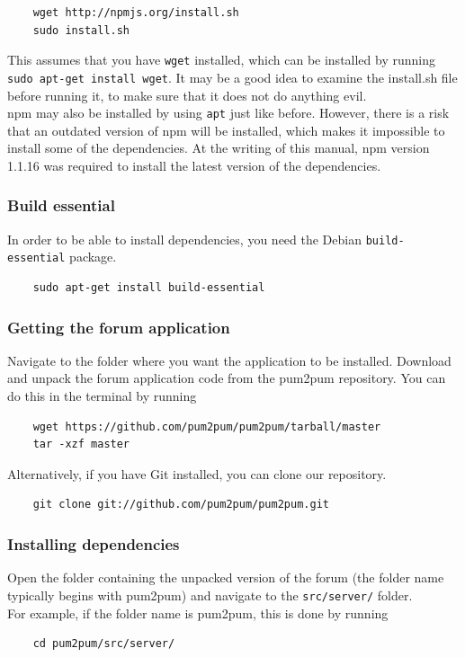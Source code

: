 \documentclass[a4paper, 12pt, titlepage]{article}
\begin{document}
	\begin{lstlisting}
	wget http://npmjs.org/install.sh
	sudo install.sh
	\end{lstlisting}

	This assumes that you have \lstinline{wget} installed, which can be installed by running \lstinline{sudo apt-get install wget}. It may be a good idea to examine the install.sh file before running it, to make sure that it does not do anything evil.\\

	npm may also be installed by using \lstinline{apt} just like before. However, there is a risk that an outdated version of npm will be installed, which makes it impossible to install some of the dependencies. At the writing of this manual, npm version 1.1.16 was required to install the latest version of the dependencies.

	\subsubsection{Build essential}
	In order to be able to install dependencies, you need the Debian \lstinline{build-essential} package.

	\begin{lstlisting}
	sudo apt-get install build-essential
	\end{lstlisting}


	\subsubsection{Getting the forum application}

	Navigate to the folder where you want the application to be installed. Download and unpack the forum application code from the pum2pum repository. You can do this in the terminal by running

	\begin{lstlisting}
	wget https://github.com/pum2pum/pum2pum/tarball/master
	tar -xzf master
	\end{lstlisting}

	Alternatively, if you have Git installed, you can clone our repository.
	\begin{lstlisting}
	git clone git://github.com/pum2pum/pum2pum.git
	\end{lstlisting}


	\subsubsection{Installing dependencies}
	Open the folder containing the unpacked version of the forum (the folder name typically begins with pum2pum) and navigate to the \lstinline{src/server/} folder.\\
	For example, if the folder name is pum2pum, this is done by running
	\begin{lstlisting}
	cd pum2pum/src/server/
	\end{lstlisting}
\end{document}
